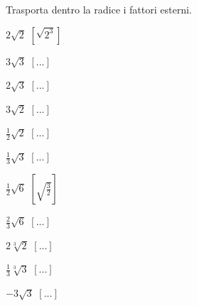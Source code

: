 
\begin{esercizio}[\Ast]
 \label{ese:2.40}
Trasporta dentro la radice i fattori esterni.
 \begin{multicols}{4}
 \begin{enumeratea}
 \item $2\sqrt 2$
  \hfill $\left[\sqrt{2^3}\right]$
 \item $3\sqrt 3$
  \hfill $\left[...\right]$
 \item $2\sqrt 3$
  \hfill $\left[...\right]$
 \item $3\sqrt 2$
  \hfill $\left[...\right]$
 \item $\frac 1 2\sqrt 2$
  \hfill $\left[...\right]$
 \item $\frac 1 3\sqrt 3$
  \hfill $\left[...\right]$
 \item $\frac 1 2\sqrt 6$
  \hfill $\left[\sqrt{\frac 3 2}\right]$
 \item $\frac 2 3\sqrt 6$
  \hfill $\left[...\right]$
 \item $2\sqrt[3]2$
  \hfill $\left[...\right]$
 \item $\frac 1 3\sqrt[3]3$
  \hfill $\left[...\right]$
 \item $-3\sqrt 3$
  \hfill $\left[...\right]$
 \end{enumeratea}
 \end{multicols}
\end{esercizio}


